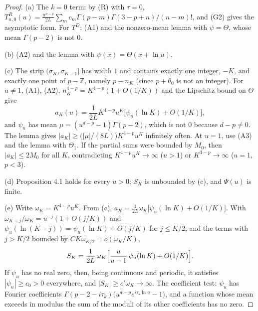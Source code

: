 \documentclass[11pt]{article}
\begin{document}
\begin{proof}
(a) The $k=0$ term: by (R) with $\tau=0$, $T^R_{n,0}(u)=\frac{u^{n-p}}{2L}\sum_mc_m\Gamma(p-m)\Gamma(3-p+n)/(n-m)!$, and (G2) gives the asymptotic form. For $T^D$: (A1) and the nonzero-mean lemma with $\psi=\Theta$, whose mean $\Gamma(p-2)$ is not $0$.

(b) (A2) and the lemma with $\psi(x)=\Theta(x+\ln u)$.

(c) The strip $(\sigma_K,\sigma_{K-1}]$ has width $1$ and contains exactly one integer, $-K$, and exactly one point of $p-\mathbb{Z}$, namely $p-n_K$ (since $p+\theta_0$ is not an integer). For $u\ne1$, (A1), (A2), $n_K^{4-p}=K^{4-p}(1+O(1/K))$ and the Lipschitz bound on $\Theta$ give
\[
a_K(u)=\frac{1}{2L}K^{4-p}u^K\bigl[\psi_u(\ln K)+O(1/K)\bigr],
\]
and $\psi_u$ has mean $\mu=(u^{d-p}-1)\Gamma(p-2)$, which is not $0$ because $d-p\ne0$. The lemma gives $|a_K|\ge\bigl(|\mu|/(8L)\bigr)K^{4-p}u^K$ infinitely often. At $u=1$, use (A3) and the lemma with $\Theta_1$. If the partial sums were bounded by $M_0$, then $|a_K|\le2M_0$ for all $K$, contradicting $K^{4-p}u^K\to\infty$ ($u>1$) or $K^{3-p}\to\infty$ ($u=1$, $p<3$).

(d) Proposition 4.1 holds for every $u>0$; $S_K$ is unbounded by (c), and $\Psi(u)$ is finite.

(e) Write $\omega_K=K^{4-p}u^K$. From (c), $a_K=\frac{1}{2L}\omega_K\bigl[\psi_u(\ln K)+O(1/K)\bigr]$. With $\omega_{K-j}/\omega_K=u^{-j}(1+O(j/K))$ and $\psi_u(\ln(K-j))=\psi_u(\ln K)+O(j/K)$ for $j\le K/2$, and the terms with $j>K/2$ bounded by $CK\omega_{K/2}=o(\omega_K/K)$,
\[
S_K=\frac{1}{2L}\,\omega_K\Bigl[\frac{u}{u-1}\,\psi_u(\ln K)+O(1/K)\Bigr].
\]
If $\psi_u$ has no real zero, then, being continuous and periodic, it satisfies $|\psi_u|\ge c_0>0$ everywhere, and $|S_K|\ge c'\omega_K\to\infty$. The coefficient test: $\psi_u$ has Fourier coefficients $\Gamma(p-2-i\tau_k)\bigl(u^{d-p}e^{i\tau_k\ln u}-1\bigr)$, and a function whose mean exceeds in modulus the sum of the moduli of its other coefficients has no zero.
\end{proof}
\end{document}
